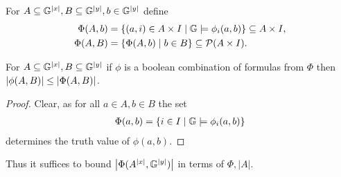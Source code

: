 \begin{Definition}
  For $A \subseteq \mathbb G^{|x|}, B \subseteq \mathbb G^{|y|}, b \in \mathbb G^{|y|}$ define
  \begin{align*}
    \Phi(A, b) &= \left\{(a, i) \in A \times I \mid \mathbb G \models \phi_i(a, b) \right\} \subseteq A \times I, \\
    \Phi(A, B) &= \left\{\Phi(A, b) \mid b \in B \right\} \subseteq \mathcal P(A \times I).
  \end{align*}  
\end{Definition}

\begin{Lemma}
  For $A \subseteq \mathbb G^{|x|}, B \subseteq \mathbb G^{|y|}$
  if $\phi$ is a boolean combination of formulas from $\Phi$ then
    $\left|\phi(A, B)\right| \leq \left|\Phi(A, B)\right|$.
\end{Lemma}
\begin{proof}
  Clear, as for all $a \in A, b \in B$ the set
  \begin{align*}
    \Phi(a, b) = \left\{i \in I \mid \mathbb G \models \phi_i(a, b)\right\}
  \end{align*}
  determines the truth value of $\phi(a,b)$.
\end{proof}

Thus it suffices to bound  $\left|\Phi(A^{|x|}, \mathbb G^{|y|})\right|$ in terms of $\Phi, |A|$.

